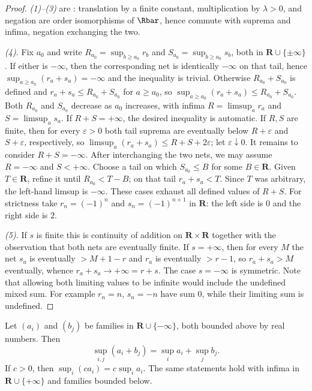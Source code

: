 \begin{proof}
\emph{(1)--(3)} are : translation by a finite
constant, multiplication by $\lambda>0$, and negation are order isomorphisms
of $\Rbar$, hence commute with suprema and infima, negation exchanging the
two.

\emph{(4).}  Fix $a_0$ and write $R_{a_0}=\sup_{b\geq a_0}r_b$ and
$S_{a_0}=\sup_{b\geq a_0}s_b$, both in $\mathbf R\cup\{\pm\infty\}$.  If
either is $-\infty$, then the corresponding net is identically $-\infty$ on
that tail, hence $\sup_{a\geq a_0}(r_a+s_a)=-\infty$ and the inequality is
trivial.  Otherwise $R_{a_0}+S_{a_0}$ is defined and
$r_a+s_a\leq R_{a_0}+S_{a_0}$ for $a\geq a_0$, so
$\sup_{a\geq a_0}(r_a+s_a)\leq R_{a_0}+S_{a_0}$.  Both $R_{a_0}$ and
$S_{a_0}$ decrease as $a_0$ increases, with infima
$R=\limsup_ar_a$ and $S=\limsup_as_a$.  If $R+S=+\infty$, the desired
inequality is automatic.  If $R,S$ are finite, then for every
$\varepsilon>0$ both tail suprema are eventually below $R+\varepsilon$ and
$S+\varepsilon$, respectively, so
$\limsup_a(r_a+s_a)\leq R+S+2\varepsilon$; let
$\varepsilon\downarrow0$.  It remains to consider $R+S=-\infty$.  After
interchanging the two nets, we may assume $R=-\infty$ and $S<+\infty$.
Choose a tail on which $S_{a_0}\leq B$ for some $B\in\mathbf R$.  Given
$T\in\mathbf R$, refine it until $R_{a_0}<T-B$; on that tail
$r_a+s_a<T$.  Since $T$ was arbitrary, the left-hand limsup is $-\infty$.
These cases exhaust all defined values of $R+S$.  For strictness take
$r_n=(-1)^n$ and $s_n=(-1)^{n+1}$ in $\mathbf R$: the left side is $0$ and
the right side is $2$.

\emph{(5).}  If $s$ is finite this is continuity of addition on
$\mathbf R\times\mathbf R$ together with the observation that both nets are
eventually finite.  If $s=+\infty$, then for every $M$ the net $s_a$ is
eventually $>M+1-r$ and $r_a$ is eventually $>r-1$, so $r_a+s_a>M$ eventually,
whence $r_a+s_a\to+\infty=r+s$.  The case $s=-\infty$ is symmetric.  Note that
allowing both limiting values to be infinite would include the undefined
mixed sum.  For example $r_n=n$, $s_n=-n$ have sum $0$, while their limiting
sum is undefined.
\end{proof}

\begin{lemma}\label{lem:safe-supremum}
Let $(a_i)$ and $(b_j)$ be families in
$\mathbf R\cup\{-\infty\}$, both bounded above by real numbers.  Then
\[
 \sup_{i,j}(a_i+b_j)=\sup_i a_i+\sup_j b_j.
\]
If $c>0$, then $\sup_i(ca_i)=c\sup_i a_i$.  The same statements hold with
infima in $\mathbf R\cup\{+\infty\}$ and families bounded below.
\end{lemma}

